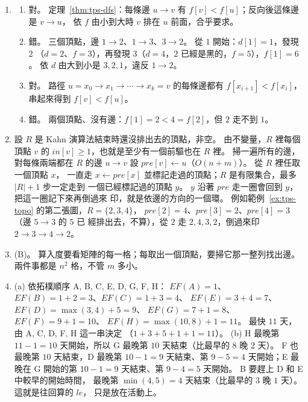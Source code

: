 \begin{enumerate}
\item
\begin{enumerate}
\item 對。 定理~\ref{thm:tps-dfs}：每條邊 $u \to v$ 有 $f[v] < f[u]$；反向後這條邊是 $v \to u$，
依 $f$ 由小到大時 $v$ 排在 $u$ 前面，合乎要求。
\item 錯。 三個頂點，邊 $1 \to 2$、$1 \to 3$、$3 \to 2$。 從 $1$ 開始：$d[1] = 1$，發現 $2$
（$d = 2$、$f = 3$），再發現 $3$（$d = 4$，$2$ 已經是黑的，$f = 5$），$f[1] = 6$。 依 $d$
由大到小是 $3, 2, 1$，違反 $1 \to 2$。
\item 對。 路徑 $u = x_0 \to x_1 \to \cdots \to x_k = v$ 的每條邊都有 $f[x_{i+1}] < f[x_i]$，
串起來得到 $f[v] < f[u]$。
\item 錯。 兩個頂點、沒有邊：$f[1] = 2 < 4 = f[2]$，但 $2$ 走不到 $1$。
\end{enumerate}

\item 設 $R$ 是 Kahn 演算法結束時還沒排出去的頂點，非空。 由不變量，$R$ 裡每個頂點 $v$ 的
$\mathit{in}[v] \ge 1$，也就是至少有一個前驅也在 $R$ 裡。 掃一遍所有的邊，對每條兩端都在
$R$ 的邊 $u \to v$ 設 $\mathit{pre}[v] \gets u$（$O(n + m)$）。 從 $R$ 裡任取一個頂點 $x$，
一直走 $x \gets \mathit{pre}[x]$ 並標記走過的頂點；$R$ 是有限集合，最多 $|R| + 1$ 步一定走到
一個已經標記過的頂點 $y$。 $y$ 沿著 $\mathit{pre}$ 走一圈會回到 $y$，把這一圈記下來再倒過來
印，就是依邊的方向的一個環。 例如範例~\ref{ex:tps-topo} 的第二張圖，$R = \{2, 3, 4\}$，
$\mathit{pre}[2] = 4$、$\mathit{pre}[3] = 2$、$\mathit{pre}[4] = 3$（邊 $5 \to 3$ 的 $5$ 已
經排出去，不算），從 $2$ 走 $2, 4, 3, 2$，倒過來印 $2 \to 3 \to 4 \to 2$。

\item (B)。 算入度要看矩陣的每一格；每取出一個頂點，要掃它那一整列找出邊。 兩件事都是
$n^2$ 格，不管 $m$ 多小。

\item (a) 依拓樸順序 A, B, C, E, D, G, F, H：
$\mathit{EF}(A) = 1$、$\mathit{EF}(B) = 1 + 2 = 3$、$\mathit{EF}(C) = 1 + 3 = 4$、
$\mathit{EF}(E) = 3 + 4 = 7$、$\mathit{EF}(D) = \max(3, 4) + 5 = 9$、
$\mathit{EF}(G) = 7 + 1 = 8$、$\mathit{EF}(F) = 9 + 1 = 10$、
$\mathit{EF}(H) = \max(10, 8) + 1 = 11$。 最快 $11$ 天，由 A, C, D, F, H 這一串決定
（$1 + 3 + 5 + 1 + 1 = 11$）。
(b) H 最晚第 $11 - 1 = 10$ 天開始，所以 G 最晚第 $10$ 天結束（比最早的 $8$ 晚 $2$ 天）。
F 也最晚第 $10$ 天結束，D 最晚第 $10 - 1 = 9$ 天結束、第 $9 - 5 = 4$ 天開始；E 最晚在 G
開始的第 $10 - 1 = 9$ 天結束、第 $9 - 4 = 5$ 天開始。 B 要趕上 D 和 E 中較早的開始時間，
最晚第 $\min(4, 5) = 4$ 天結束（比最早的 $3$ 晚 $1$ 天）。 這就是往回算的 $\mathit{le}$，
只是放在活動上。


\end{enumerate}
